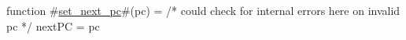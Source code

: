 function #\hyperref[sailRISCVzsetzynextzypc]{set\_next\_pc}#(pc) =
  /* could check for internal errors here on invalid pc */
  nextPC = pc
